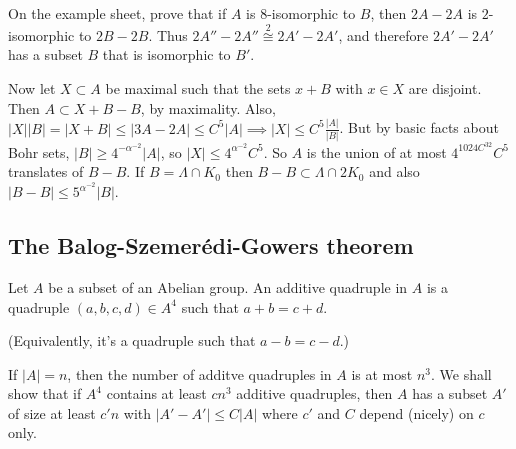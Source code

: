 \documentclass{article}
\newcommand{\1}[1]{\mathbbm{1}_{#1}}
\begin{document}
On the example sheet, prove that if $A$ is $8$-isomorphic to $B$, then $2A-2A$ is $2$-isomorphic to $2B - 2B$.
Thus $2A'' - 2A'' \overset{2}{\cong} 2A' - 2A'$, and therefore $2A' - 2A'$ has a subset $B$ that is isomorphic to $B'$.

Now let $X \subset A$ be maximal such that the sets $x + B$ with $x \in X$ are disjoint.
Then $A \subset X + B - B$, by maximality.
Also, $|X| |B| = |X + B| \leq |3A - 2A| \leq C^5 |A| \implies |X| \leq C^5 \frac{|A|}{|B|}$.
But by basic facts about Bohr sets, $|B| \geq 4^{-\alpha^{-2}} |A|$, so $|X| \leq 4^{\alpha^{-2}} C^5$.
So $A$ is the union of at most $4^{1024 C^{32}} C^5$ translates of $B-B$.
If $B = \Lambda \cap K_0$ then $B - B \subset \Lambda \cap 2K_0$ and also $|B-B| \leq 5^{\alpha^{-2}} |B|$.

\subsection{The Balog-Szemer\'edi-Gowers theorem}
\begin{defi}
  Let $A$ be a subset of an Abelian group. An additive quadruple in $A$ is a quadruple $(a,b,c,d) \in A^4$ such that $a+b = c+d$.
\end{defi}
(Equivalently, it's a quadruple such that $a - b = c-d$.)

If $|A|=n$, then the number of additve quadruples in $A$ is at most $n^3$.
We shall show that if $A^4$ contains at least $cn^3$ additive quadruples, then $A$ has a subset $A'$ of size at least $c' n$ with $|A' - A'| \leq C|A|$ where $c'$ and $C$ depend (nicely) on $c$ only.
\end{document}
